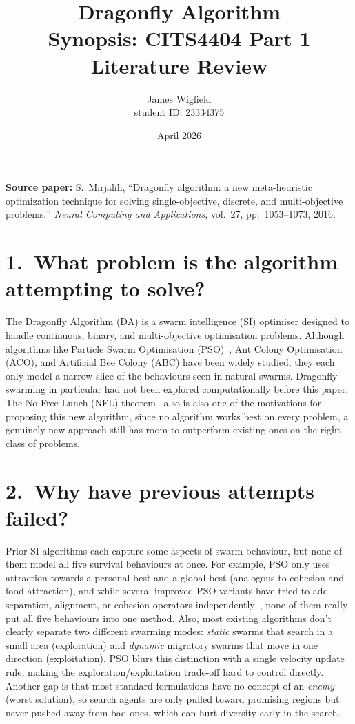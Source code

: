 \documentclass[11pt,a4paper]{article}
\title{\textbf{Dragonfly Algorithm}\\
       \large Synopsis: CITS4404 Part 1 Literature Review}
\author{James Wigfield \\ student ID: 23334375}
\date{April 2026}
\begin{document}
\maketitle

\noindent\textbf{Source paper:} S.\ Mirjalili, ``Dragonfly algorithm: a new meta-heuristic optimization technique for solving single-objective, discrete, and multi-objective problems,'' \textit{Neural Computing and Applications}, vol.~27, pp.~1053--1073, 2016.~\cite{mirjalili2016dragonfly}

\bigskip

\section*{1.\ What problem is the algorithm attempting to solve?}

The Dragonfly Algorithm (DA) is a swarm intelligence (SI) optimiser designed to
handle continuous, binary, and multi-objective optimisation problems.
Although algorithms like Particle Swarm Optimisation (PSO)~\cite{kennedy1995pso},
Ant Colony Optimisation (ACO), and Artificial Bee Colony (ABC) have been widely
studied, they each only model a narrow slice of the behaviours seen in natural swarms.
Dragonfly swarming in particular had not been explored computationally before this paper.
The No Free Lunch (NFL) theorem~\cite{wolpert1997nfl} also is also one of the motivations
for proposing this new algorithm, since no algorithm works best on every problem, a genuinely new approach
still has room to outperform existing ones on the right class of problems.

\bigskip



\section*{2.\ Why have previous attempts failed?}

Prior SI algorithms each capture some aspects of swarm behaviour, but none of them model all five survival behaviours at once.
For example, PSO only uses attraction towards a personal best and a global best (analogous to cohesion and food attraction), 
and while several improved PSO variants have tried to add separation, alignment, or cohesion operators independently~\cite{cui2009boid,kadrovach2002particle,cui2009alignment}, 
none of them really put all five behaviours into one method. Also, most existing algorithms don't clearly separate two different swarming modes: 
\textit{static} swarms that search in a small area (exploration) and \textit{dynamic} migratory swarms that move in one direction (exploitation).
PSO blurs this distinction with a single velocity update rule, making the exploration/exploitation trade-off hard to control directly.
Another gap is that most standard formulations have no concept of an \textit{enemy} (worst solution), 
so search agents are only pulled toward promising regions but never pushed away from bad ones, which can hurt diversity early in the search.
\end{document}
